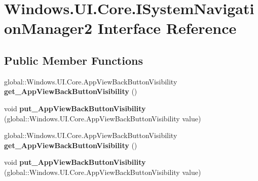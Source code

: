 \hypertarget{interface_windows_1_1_u_i_1_1_core_1_1_i_system_navigation_manager2}{}\section{Windows.\+U\+I.\+Core.\+I\+System\+Navigation\+Manager2 Interface Reference}
\label{interface_windows_1_1_u_i_1_1_core_1_1_i_system_navigation_manager2}
\subsection*{Public Member Functions}
\begin{DoxyCompactItemize}
\item 
\mbox{\label{interface_windows_1_1_u_i_1_1_core_1_1_i_system_navigation_manager2_ade85ceb38ee3c82b70ebf9159dae8d03}} 
global\+::\+Windows.\+U\+I.\+Core.\+App\+View\+Back\+Button\+Visibility {\bfseries get\+\_\+\+App\+View\+Back\+Button\+Visibility} ()
\item 
\mbox{\label{interface_windows_1_1_u_i_1_1_core_1_1_i_system_navigation_manager2_affcf0dd5301e8f89cfc099f18dbd0573}} 
void {\bfseries put\+\_\+\+App\+View\+Back\+Button\+Visibility} (global\+::\+Windows.\+U\+I.\+Core.\+App\+View\+Back\+Button\+Visibility value)
\item 
\mbox{\label{interface_windows_1_1_u_i_1_1_core_1_1_i_system_navigation_manager2_ade85ceb38ee3c82b70ebf9159dae8d03}} 
global\+::\+Windows.\+U\+I.\+Core.\+App\+View\+Back\+Button\+Visibility {\bfseries get\+\_\+\+App\+View\+Back\+Button\+Visibility} ()
\item 
\mbox{\label{interface_windows_1_1_u_i_1_1_core_1_1_i_system_navigation_manager2_affcf0dd5301e8f89cfc099f18dbd0573}} 
void {\bfseries put\+\_\+\+App\+View\+Back\+Button\+Visibility} (global\+::\+Windows.\+U\+I.\+Core.\+App\+View\+Back\+Button\+Visibility value)
\item 
\mbox{\label{interface_windows_1_1_u_i_1_1_core_1_1_i_system_navigation_manager2_ade85ceb38ee3c82b70ebf9159dae8d03}} 

\end{DoxyCompactItemize}
